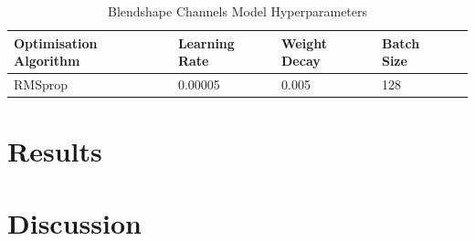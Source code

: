 \begin{table}[h!]
\centering
    \begin{tabular}{ | l | l | l | l | l |}
    \hline
    Optimisation Algorithm & Learning Rate & Weight Decay & Batch Size \\ \hline
    RMSprop & 0.00005 & 0.005 & 128 \\
    \hline
    \end{tabular} 
    \caption{Blendshape Channels Model Hyperparameters}
\end{table}\label{table:blendshape_channels_classifier_hyperparameters}

\section{Results}

\section{Discussion}

%
%
%